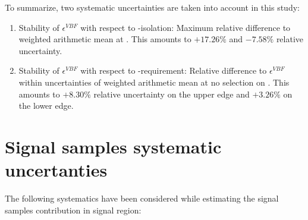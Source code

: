 To summarize, two systematic uncertainties are taken into account in this study:

\begin{enumerate}
	\item Stability of $\epsilon^{VBF}$ with respect to \hadtau-isolation: Maximum relative difference to weighted arithmetic mean at \gev. This amounts to $+17.26\%$ and  $-7.58\%$ relative uncertainty.
	\item Stability of $\epsilon^{VBF}$ with respect to \met-requirement: Relative difference to $\epsilon^{VBF}$ within uncertainties of weighted arithmetic mean at no selection on \met. This amounts to $+8.30\%$ relative uncertainty on the upper edge and $+3.26\%$ on the lower edge.
\end{enumerate}


\clearpage

\section{Signal samples systematic uncertanties}
\label{sec:systematics}

The following systematics have been considered while estimating the signal samples contribution in signal region:

